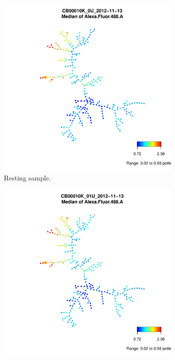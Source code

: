 \hspace{-2cm}
\begin{figure}[h]
  \centering
\begin{subfigure}[b]{.4\textwidth}
  \includegraphics[scale=.4]{IL2/figures/CB00010K-0U-2012-11-13-spade.pdf}
\caption{Resting sample.}
\end{subfigure}
\begin{subfigure}[b]{.4\textwidth}
  \includegraphics[scale=.4]{IL2/figures/CB00010K-01U-2012-11-13-spade.pdf}

\end{subfigure}
\end{figure}
